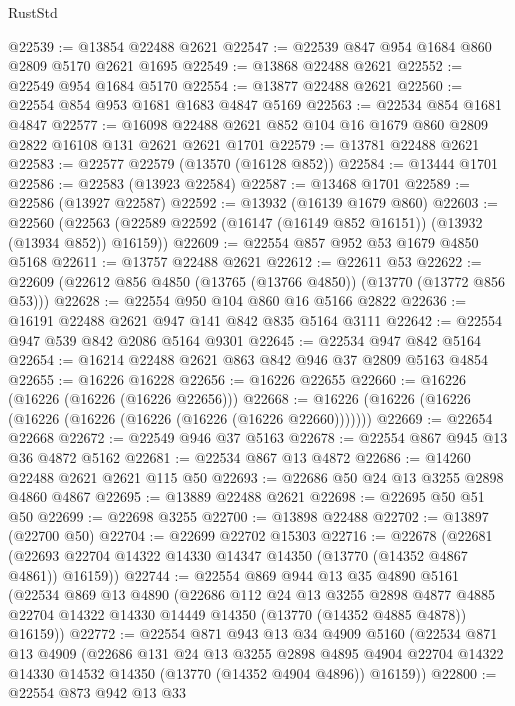 \begin{lexlean}{RustStd}
\begin{coremodule}
@22539 := @13854 @22488 @2621
@22547 := @22539 @847 @954 @1684 @860 @2809 @5170 @2621 @1695
@22549 := @13868 @22488 @2621
@22552 := @22549 @954 @1684 @5170
@22554 := @13877 @22488 @2621
@22560 := @22554 @854 @953 @1681 @1683 @4847 @5169
@22563 := @22534 @854 @1681 @4847
@22577 := @16098 @22488 @2621 @852 @104 @16 @1679 @860 @2809 @2822 @16108 @131 @2621 @2621 @1701
@22579 := @13781 @22488 @2621
@22583 := @22577 @22579 (@13570 (@16128 @852))
@22584 := @13444 @1701
@22586 := @22583 (@13923 @22584)
@22587 := @13468 @1701
@22589 := @22586 (@13927 @22587)
@22592 := @13932 (@16139 @1679 @860)
@22603 := @22560
    (@22563 (@22589 @22592 (@16147 (@16149 @852 @16151)) (@13932 (@13934 @852)) @16159))
@22609 := @22554 @857 @952 @53 @1679 @4850 @5168
@22611 := @13757 @22488 @2621
@22612 := @22611 @53
@22622 := @22609 (@22612 @856 @4850 (@13765 (@13766 @4850)) (@13770 (@13772 @856 @53)))
@22628 := @22554 @950 @104 @860 @16 @5166 @2822
@22636 := @16191 @22488 @2621 @947 @141 @842 @835 @5164 @3111
@22642 := @22554 @947 @539 @842 @2086 @5164 @9301
@22645 := @22534 @947 @842 @5164
@22654 := @16214 @22488 @2621 @863 @842 @946 @37 @2809 @5163 @4854
@22655 := @16226 @16228
@22656 := @16226 @22655
@22660 := @16226 (@16226 (@16226 (@16226 @22656)))
@22668 := @16226 (@16226 (@16226 (@16226 (@16226 (@16226 (@16226 (@16226 @22660)))))))
@22669 := @22654 @22668
@22672 := @22549 @946 @37 @5163
@22678 := @22554 @867 @945 @13 @36 @4872 @5162
@22681 := @22534 @867 @13 @4872
@22686 := @14260 @22488 @2621 @2621 @115 @50
@22693 := @22686 @50 @24 @13 @3255 @2898 @4860 @4867
@22695 := @13889 @22488 @2621
@22698 := @22695 @50 @51 @50
@22699 := @22698 @3255
@22700 := @13898 @22488
@22702 := @13897 (@22700 @50)
@22704 := @22699 @22702 @15303
@22716 := @22678
    (@22681 (@22693 @22704 @14322 @14330 @14347 @14350 (@13770 (@14352 @4867 @4861)) @16159))
@22744 := @22554
    @869
    @944
    @13
    @35
    @4890
    @5161
    (@22534
      @869
      @13
      @4890
      (@22686
        @112
        @24
        @13
        @3255
        @2898
        @4877
        @4885
        @22704
        @14322
        @14330
        @14449
        @14350
        (@13770 (@14352 @4885 @4878))
        @16159))
@22772 := @22554
    @871
    @943
    @13
    @34
    @4909
    @5160
    (@22534
      @871
      @13
      @4909
      (@22686
        @131
        @24
        @13
        @3255
        @2898
        @4895
        @4904
        @22704
        @14322
        @14330
        @14532
        @14350
        (@13770 (@14352 @4904 @4896))
        @16159))
@22800 := @22554
    @873
    @942
    @13
    @33

\end{coremodule}
\end{lexlean}
